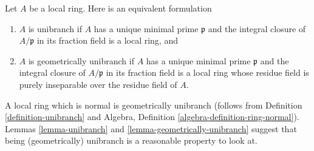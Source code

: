 \noindent
Let $A$ be a local ring. Here is an equivalent formulation
\begin{enumerate}
\item $A$ is unibranch if $A$ has a unique minimal prime $\mathfrak p$ and
the integral closure of $A/\mathfrak p$ in its fraction field is a
local ring, and
\item $A$ is geometrically unibranch if $A$ has a unique minimal prime
$\mathfrak p$ and the integral closure of $A/\mathfrak p$ in its
fraction field is a local ring whose residue field is purely inseparable
over the residue field of $A$.
\end{enumerate}
A local ring which is normal is geometrically unibranch
(follows from Definition \ref{definition-unibranch} and
Algebra, Definition \ref{algebra-definition-ring-normal}).
Lemmas \ref{lemma-unibranch} and \ref{lemma-geometrically-unibranch}
suggest that being (geometrically) unibranch
is a reasonable property to look at.

